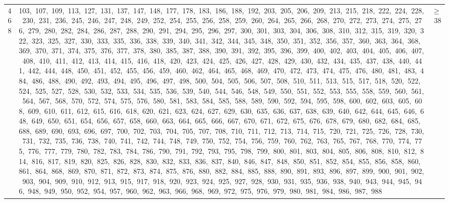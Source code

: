 \begin{longtable}{c|p{}|r}
468 & 103,\ 107,\ 109,\ 113,\ 127,\ 131,\ 137,\ 147,\ 148,\ 177,\ 178,\ 183,\ 186,\ 188,\ 192,\ 203,\ 205,\ 206,\ 209,\ 213,\ 215,\ 218,\ 222,\ 224,\ 228,\ 230,\ 231,\ 236,\ 245,\ 246,\ 247,\ 248,\ 249,\ 252,\ 254,\ 255,\ 256,\ 258,\ 259,\ 260,\ 264,\ 265,\ 266,\ 268,\ 270,\ 272,\ 273,\ 274,\ 275,\ 276,\ 279,\ 280,\ 282,\ 284,\ 286,\ 287,\ 288,\ 290,\ 291,\ 294,\ 295,\ 296,\ 297,\ 300,\ 301,\ 303,\ 304,\ 306,\ 308,\ 310,\ 312,\ 315,\ 319,\ 320,\ 322,\ 323,\ 325,\ 327,\ 330,\ 333,\ 335,\ 336,\ 338,\ 339,\ 340,\ 341,\ 342,\ 344,\ 345,\ 348,\ 350,\ 351,\ 352,\ 356,\ 357,\ 360,\ 363,\ 364,\ 368,\ 369,\ 370,\ 371,\ 374,\ 375,\ 376,\ 377,\ 378,\ 380,\ 385,\ 387,\ 388,\ 390,\ 391,\ 392,\ 395,\ 396,\ 399,\ 400,\ 402,\ 403,\ 404,\ 405,\ 406,\ 407,\ 408,\ 410,\ 411,\ 412,\ 413,\ 414,\ 415,\ 416,\ 418,\ 420,\ 423,\ 424,\ 425,\ 426,\ 427,\ 428,\ 429,\ 430,\ 432,\ 434,\ 435,\ 437,\ 438,\ 440,\ 441,\ 442,\ 444,\ 448,\ 450,\ 451,\ 452,\ 455,\ 456,\ 459,\ 460,\ 462,\ 464,\ 465,\ 468,\ 469,\ 470,\ 472,\ 473,\ 474,\ 475,\ 476,\ 480,\ 481,\ 483,\ 484,\ 486,\ 488,\ 490,\ 492,\ 493,\ 494,\ 495,\ 496,\ 497,\ 498,\ 500,\ 504,\ 505,\ 506,\ 507,\ 508,\ 510,\ 511,\ 513,\ 515,\ 517,\ 518,\ 520,\ 522,\ 524,\ 525,\ 527,\ 528,\ 530,\ 532,\ 533,\ 534,\ 535,\ 536,\ 539,\ 540,\ 544,\ 546,\ 548,\ 549,\ 550,\ 551,\ 552,\ 553,\ 555,\ 558,\ 559,\ 560,\ 561,\ 564,\ 567,\ 568,\ 570,\ 572,\ 574,\ 575,\ 576,\ 580,\ 581,\ 583,\ 584,\ 585,\ 588,\ 589,\ 590,\ 592,\ 594,\ 595,\ 598,\ 600,\ 602,\ 603,\ 605,\ 608,\ 609,\ 610,\ 611,\ 612,\ 615,\ 616,\ 618,\ 620,\ 621,\ 623,\ 624,\ 627,\ 629,\ 630,\ 635,\ 636,\ 637,\ 638,\ 639,\ 640,\ 642,\ 644,\ 645,\ 646,\ 648,\ 649,\ 650,\ 651,\ 654,\ 656,\ 657,\ 658,\ 660,\ 663,\ 664,\ 665,\ 666,\ 667,\ 670,\ 671,\ 672,\ 675,\ 676,\ 678,\ 679,\ 680,\ 682,\ 684,\ 685,\ 688,\ 689,\ 690,\ 693,\ 696,\ 697,\ 700,\ 702,\ 703,\ 704,\ 705,\ 707,\ 708,\ 710,\ 711,\ 712,\ 713,\ 714,\ 715,\ 720,\ 721,\ 725,\ 726,\ 728,\ 730,\ 731,\ 732,\ 735,\ 736,\ 738,\ 740,\ 741,\ 742,\ 744,\ 748,\ 749,\ 750,\ 752,\ 754,\ 756,\ 759,\ 760,\ 762,\ 763,\ 765,\ 767,\ 768,\ 770,\ 774,\ 775,\ 776,\ 777,\ 779,\ 780,\ 782,\ 783,\ 784,\ 786,\ 790,\ 791,\ 792,\ 793,\ 795,\ 798,\ 799,\ 800,\ 801,\ 803,\ 804,\ 805,\ 806,\ 808,\ 810,\ 812,\ 814,\ 816,\ 817,\ 819,\ 820,\ 825,\ 826,\ 828,\ 830,\ 832,\ 833,\ 836,\ 837,\ 840,\ 846,\ 847,\ 848,\ 850,\ 851,\ 852,\ 854,\ 855,\ 856,\ 858,\ 860,\ 861,\ 864,\ 868,\ 869,\ 870,\ 871,\ 872,\ 873,\ 874,\ 875,\ 876,\ 880,\ 882,\ 884,\ 885,\ 888,\ 890,\ 891,\ 893,\ 896,\ 897,\ 899,\ 900,\ 901,\ 902,\ 903,\ 904,\ 909,\ 910,\ 912,\ 913,\ 915,\ 917,\ 918,\ 920,\ 923,\ 924,\ 925,\ 927,\ 928,\ 930,\ 931,\ 935,\ 936,\ 938,\ 940,\ 943,\ 944,\ 945,\ 946,\ 948,\ 949,\ 950,\ 952,\ 954,\ 957,\ 960,\ 962,\ 963,\ 966,\ 968,\ 969,\ 972,\ 975,\ 976,\ 979,\ 980,\ 981,\ 984,\ 986,\ 987,\ 988 & $\ge$ 38 \\

\end{longtable}
